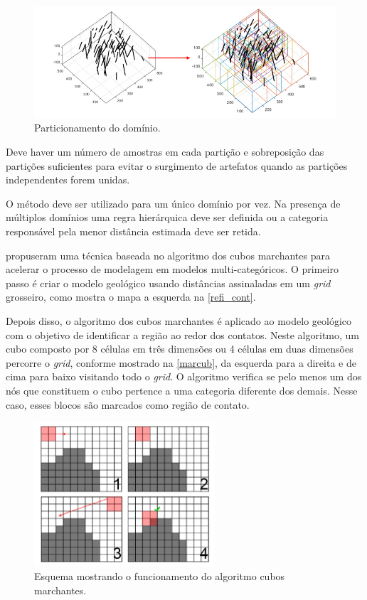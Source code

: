 \begin{figure}[H]
	\caption{\label{pou}Particionamento do domínio.}
	\centering
		\includegraphics[width=\textwidth]{capitulo_2/imagens/pou.jpg}
\end{figure}

Deve haver um número de amostras em cada partição e sobreposição das partições suficientes para evitar o surgimento de artefatos quando as partições independentes forem unidas.

O método deve ser utilizado para um único domínio por vez. Na presença de múltiplos domínios uma regra hierárquica deve ser definida ou a categoria responsável pela menor distância estimada deve ser retida.

 \label{bound_ref}

 propuseram uma técnica baseada no algoritmo dos cubos marchantes \cite{lorensen1987marching} para acelerar o processo de modelagem em modelos multi-categóricos. O primeiro passo é criar o modelo geológico usando distâncias assinaladas em um \textit{grid} grosseiro, como mostra o mapa a esquerda na \autoref{refi_cont}. 

Depois disso, o algoritmo dos cubos marchantes é aplicado ao modelo geológico com o objetivo de identificar a região ao redor dos contatos. Neste algoritmo, um cubo composto por 8 células em três dimensões ou 4 células em duas dimensões percorre o \textit{grid}, conforme mostrado na \autoref{marcub}, da esquerda para a direita e de cima para baixo visitando todo o \textit{grid}. O algoritmo verifica se pelo menos um dos nós que constituem o cubo pertence a uma categoria diferente dos demais. Nesse caso, esses blocos são marcados como região de contato. 

\begin{figure}[H]
\caption{\label{marcub} Esquema mostrando o funcionamento do algoritmo cubos marchantes.}
	\centering
		\includegraphics[width=0.6\textwidth]{capitulo_2/imagens/marching_cubes.png}
\end{figure}

